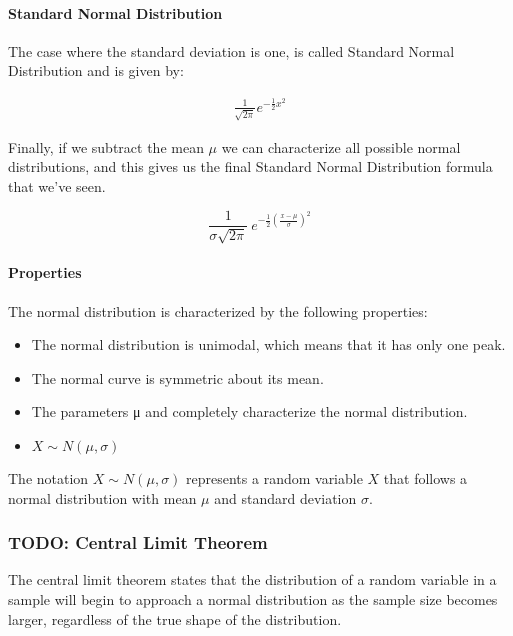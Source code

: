 \documentclass[11pt]{article}
\begin{document}
\hypertarget{standard-normal-distribution}{%
\paragraph{Standard Normal Distribution}\label{standard-normal-distribution}}
The case where the standard deviation is one, is called Standard
Normal Distribution and is given by:

\begin{gather}
  \frac{1}{\sqrt{2\pi}} e^{-\frac{1}{2}x^2}
\end{gather}

Finally, if we subtract the mean \(\mu\) we can characterize all
possible normal distributions, and this gives us the final Standard Normal Distribution 
formula that we've seen.


\[\frac{1}{\sigma \sqrt{2\pi}} \ e^{-\frac{1}{2}(\frac{x - \mu }{\sigma})^2}\]

\hypertarget{properties-of-the-normal-distribution}{%
\paragraph{Properties}\label{properties-of-the-normal-distribution}}

The normal distribution is characterized by the following properties:
\begin{itemize}
\item The normal distribution is unimodal, which means that it has only one peak.
\item The normal curve is symmetric about its mean.
\item The parameters μ and \sigma completely characterize the normal distribution.
\item \(X \sim N(\mu,\sigma)\)
\end{itemize}

The notation \(X \sim N(\mu,\sigma)\) represents a random variable \(X\) that follows
a normal distribution with mean \(\mu\) and standard deviation \(\sigma\).

\hypertarget{central-limit-theorem}{%
\subsubsection{TODO: Central Limit Theorem}\label{central-limit-theorem}}
The central limit theorem states that the distribution of a random
variable in a sample will begin to approach a normal distribution as the
sample size becomes larger, regardless of the true shape of the
distribution.
\end{document}

